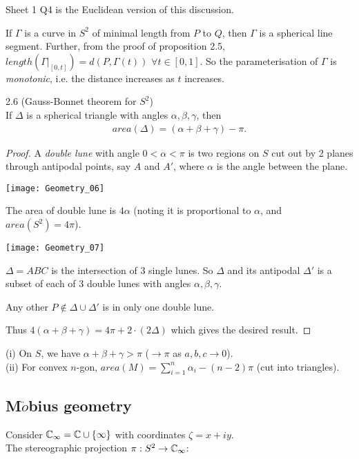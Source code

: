 \documentclass[a4paper]{article}
\begin{document}
Sheet 1 Q4 is the Euclidean version of this discussion.

\begin{rem}
If $\Gamma$ is a curve in $S^2$ of minimal length from $P$ to $Q$, then $\Gamma$ is a spherical line segment. Further, from the proof of proposition 2.5, $length(\Gamma|_{[0,t]}) = d(P,\Gamma(t))$ $\forall t \in [0,1]$. So the parameterisation of $\Gamma$ is \emph{monotonic}, i.e. the distance increases as $t$ increases.
\end{rem}

\begin{prop} 2.6 (Gauss-Bonnet theorem for $S^2$)\\
If $\Delta$ is a spherical triangle with angles $\alpha,\beta,\gamma$, then 
\begin{equation*}
\begin{aligned}
area(\Delta) = (\alpha+\beta+\gamma)-\pi.
\end{aligned}
\end{equation*}
\begin{proof}
A \emph{double lune} with angle $0<\alpha<\pi$ is two regions on $S$ cut out by 2 planes through antipodal points, say $A$ and $A'$, where $\alpha$ is the angle between the plane.

\texttt{[image: Geometry\_06]}

The area of double lune is $4\alpha$ (noting it is proportional to $\alpha$, and $area(S^2) = 4\pi$).

\texttt{[image: Geometry\_07]}

$\Delta = ABC$ is the intersection of 3 single lunes. So $\Delta$ and its antipodal $\Delta'$ is a subset of each of 3 double lunes with angles $\alpha,\beta,\gamma$.

Any other $P \not\in \Delta \cup \Delta'$ is in only one double lune.

Thus $4(\alpha+\beta+\gamma) = 4\pi + 2\cdot (2\Delta)$ which gives the desired result.
\end{proof}
\end{prop}

\begin{rem}
(i) On $S$, we have $\alpha+\beta+\gamma>\pi$ ($\to \pi$ as $a,b,c \to 0$). \\
(ii) For convex $n$-gon, $area(M) = \sum_{i=1}^n \alpha_i - (n-2)\pi$ (cut into triangles).
\end{rem}

\subsection{M$\ddot{o}$bius geometry}
Consider $\mathbb{C}_\infty = \mathbb{C} \cup \{\infty\}$ with coordinates $\zeta=x+iy$.\\
The stereographic projection $\pi:S^2 \to \mathbb{C}_\infty$:
\end{document}
